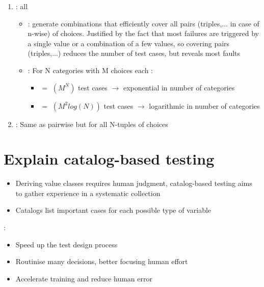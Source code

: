 \begin{enumerate}
    \item {} : all 
    \begin{itemize}
        \item {} : generate combinations that efficiently cover all pairs (triples,... in case of n-wise) of choices. Justified by the fact that most failures are triggered by a single value or a combination of a few values, so covering pairs (triples,...) reduces the number of test cases, but reveals most faults
        \item {} : For N categories with M choices each :
        \begin{itemize}
            \item {} $=$ \bigO$(M^N)$ test cases $\rightarrow$ exponential in number of categories
            \item {} $=$ \bigO$(M^2  log(N))$ test cases $\rightarrow$ logarithmic in number of categories
        \end{itemize}
    \end{itemize}
    \item {} : Same as pairwise but for all N-tuples of choices
\end{enumerate}

\newpage
\section{Explain catalog-based testing}

\begin{itemize}
    \item Deriving value classes requires human judgment, catalog-based testing aims to gather experience in a systematic collection
    \item Catalogs list important cases for each possible type of variable
\end{itemize}

 :
\begin{itemize}
    \item Speed up the test design process
    \item Routinise many decisions, better focusing human effort
    \item Accelerate training and reduce human error
\end{itemize}

